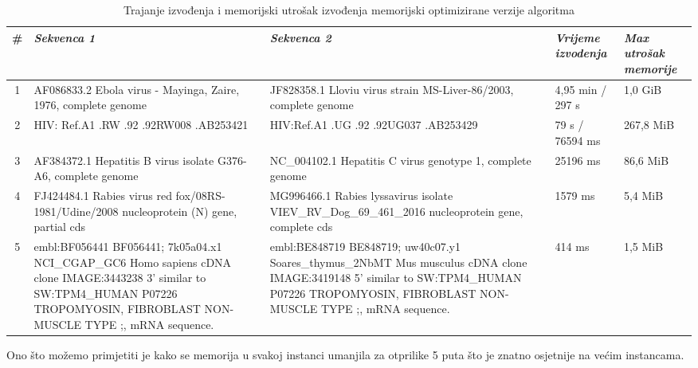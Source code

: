 \documentclass[a4paper]{article}
\begin{document}
\begin{table}[H]
\centering
\begin{tabular}{|c||p{4cm}|p{4.25cm}|p{2cm}|p{2cm}|}
\hline
\# & \textit{\textbf{Sekvenca 1}} & \textit{\textbf{Sekvenca 2}} & \textit{\textbf{Vrijeme izvodenja}} & \textit{\textbf{Max utrošak memorije}} \\ \hline
1 & AF086833.2 Ebola virus - Mayinga, Zaire, 1976, complete genome & JF828358.1 Lloviu virus strain MS-Liver-86/2003, complete genome & 4,95 min / 297 s & 1,0 GiB \\ \hline
2 & HIV: Ref.A1 .RW .92 .92RW008 .AB253421 & HIV:Ref.A1 .UG .92 .92UG037 .AB253429 & 79 s / 76594 ms & 267,8 MiB \\ \hline
3 & AF384372.1 Hepatitis B virus isolate G376-A6, complete genome & NC\_004102.1 Hepatitis C virus genotype 1, complete genome & 25196 ms & 86,6 MiB \\ \hline
4 & FJ424484.1 Rabies virus red fox/08RS-1981/Udine/2008 nucleoprotein (N) gene, partial cds & MG996466.1 Rabies lyssavirus isolate VIEV\_RV\_Dog\_69\_461\_2016 nucleoprotein gene, complete cds & 1579 ms & 5,4 MiB \\ \hline
5 & embl:BF056441 BF056441; 7k05a04.x1 NCI\_CGAP\_GC6 Homo sapiens cDNA clone IMAGE:3443238 3' similar to SW:TPM4\_HUMAN P07226 TROPOMYOSIN, FIBROBLAST NON-MUSCLE TYPE ;, mRNA sequence. & embl:BE848719 BE848719; uw40c07.y1 Soares\_thymus\_2NbMT Mus musculus cDNA clone IMAGE:3419148 5' similar to SW:TPM4\_HUMAN P07226 TROPOMYOSIN, FIBROBLAST NON-MUSCLE TYPE ;, mRNA sequence. & 414 ms & 1,5 MiB \\ \hline
\end{tabular}
\caption{Trajanje izvođenja i memorijski utrošak izvođenja memorijski optimizirane verzije algoritma}
\label{table:economicSchools}   
\end{table}

Ono što možemo primjetiti je kako se memorija u svakoj instanci umanjila za otprilike 5 puta što je znatno osjetnije na većim instancama.
\end{document}
